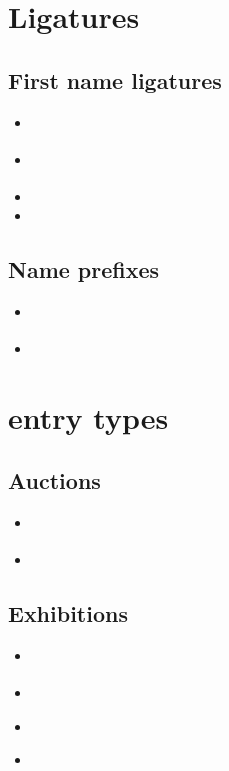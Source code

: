 \documentclass[a4paper,12pt]{scrartcl}
\begin{document}
\section{Ligatures}


\subsection{First name ligatures}
\begin{itemize}
	\item\cite{test::firstnames::2}%
	\item\cite{test::firstnames::1}%
    \item{}%
	\item{}%
\end{itemize}

\subsection{Name prefixes}
\begin{itemize}
	\item\cite{test::prefixnames::1}%
	\item{}%
\end{itemize}

\section{entry types}

\subsection{Auctions}
\begin{itemize}
    \item\cite{hesse:c:1995}%
	\item{}
\end{itemize}

\subsection{Exhibitions}
\begin{itemize}
    \item\cite{schaedler:1999}%
	\item{}%
    \item\cite{oberlechner:1999}%
	\item{}%
\end{itemize}
\end{document}
